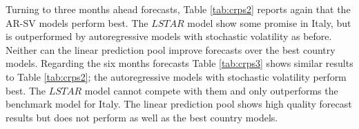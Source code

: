 \documentclass[12pt,letterpaper,fleqn]{article}           %
\begin{document}
Turning to three months ahead forecasts, Table \ref{tab:crps2} reports again that the AR-SV models perform best. The $LSTAR$ model show some promise in Italy, but is outperformed by autoregressive models with stochastic volatility as before. Neither can the linear prediction pool improve forecasts over the best country models. Regarding the six months forecasts Table \ref{tab:crps3} shows similar results to Table \ref{tab:crps2}; the autoregressive models with stochastic volatility perform best. The $LSTAR$ model cannot compete with them and only outperforms the benchmark model for Italy. The linear prediction pool shows high quality forecast results but does not perform as well as the best country models.

\begin{table}[!htbp] 
\captionsetup{singlelinecheck=false, justification=justified}
\centering 
{}
\end{table}
\end{document}
